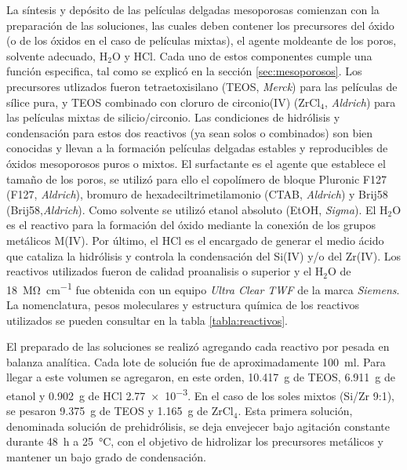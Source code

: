 			La síntesis y depósito de las películas delgadas mesoporosas comienzan con la preparación de las soluciones, las cuales deben contener los precursores del óxido (o de los óxidos en el caso de películas mixtas), el agente moldeante de los poros, solvente adecuado, H$_2$O y HCl\cite{Brinker1990}. Cada uno de estos componentes cumple una función especifica, tal como se explicó en la sección \ref{sec:mesoporosos}. Los precursores utlizados fueron tetraetoxisilano (TEOS, \textit{Merck}) para las películas de sílice pura, y TEOS combinado con cloruro de circonio(IV) (ZrCl$_4$, \textit{Aldrich}) para las películas mixtas de silicio/circonio. Las condiciones de hidrólisis y condensación para estos dos reactivos (ya sean solos o combinados) son bien conocidas y llevan a la formación películas delgadas estables y reproducibles de óxidos mesoporosos puros o mixtos\cite{Soler-Illia2004,Crepaldi2002a,Angelome2008}. El surfactante es el agente que establece el tamaño de los poros, se utilizó para ello el copolímero de bloque Pluronic F127 (F127, \textit{Aldrich}), bromuro de hexadeciltrimetilamonio (CTAB, \textit{Aldrich}) y Brij58\index{Brij58} (Brij58,\textit{Aldrich}). Como solvente se utilizó etanol absoluto (EtOH, \textit{Sigma}). El H$_2$O es el reactivo para la formación del óxido mediante la conexión de los grupos metálicos M(IV). Por último, el HCl es el encargado de generar el medio ácido que cataliza la hidrólisis y controla la condensación del Si(IV) y/o del Zr(IV). Los reactivos utilizados fueron de calidad proanalisis o superior y el H$_2$O de \SI{18}{\mega\ohm\per\cm} fue obtenida con un equipo \textit{Ultra Clear TWF} de la marca \textit{Siemens}. La nomenclatura, pesos moleculares y estructura química de los reactivos utilizados se pueden consultar en la tabla \ref{tabla:reactivos}.
					
			El preparado de las soluciones se realizó agregando cada reactivo por pesada en balanza analítica. Cada lote de solución fue de aproximadamente \SI{100}{\ml}. Para llegar a este volumen se agregaron, en este orden, \SI{10.417}{\gram} de TEOS, \SI{6.911}{\gram} de etanol y \SI{0.902}{\gram} de HCl \SI{2,77e-3}{\Molar}. En el caso de los soles mixtos (Si/Zr 9:1), se pesaron \SI{9.375}{\gram} de TEOS y \SI{1.165}{\gram} de ZrCl$_4$. Esta primera solución, denominada solución de prehidrólisis, se deja envejecer bajo agitación constante durante \SI{48}{\hour} a \SI{25}{\celsius}, con el objetivo de hidrolizar los precursores metálicos y mantener un bajo grado de condensación.\cite{Grosso2001}

